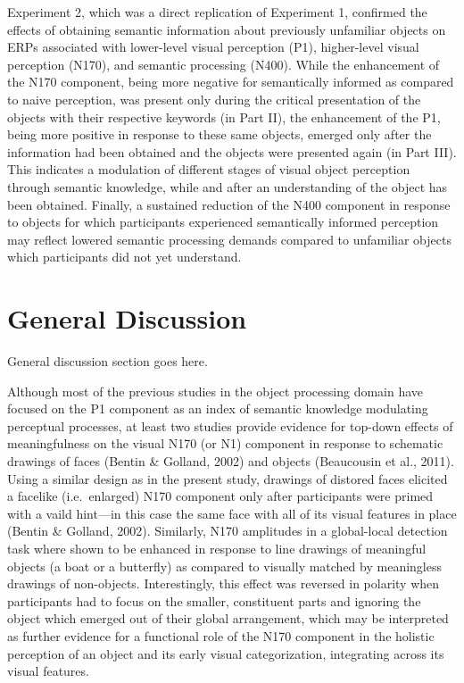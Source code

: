 \documentclass[
  english,
  man,11pt,floatsintext]{apa7}
\begin{document}
Experiment 2, which was a direct replication of Experiment 1, confirmed the effects of obtaining semantic information about previously unfamiliar objects on ERPs associated with lower-level visual perception (P1), higher-level visual perception (N170), and semantic processing (N400). While the enhancement of the N170 component, being more negative for semantically informed as compared to naive perception, was present only during the critical presentation of the objects with their respective keywords (in Part II), the enhancement of the P1, being more positive in response to these same objects, emerged only after the information had been obtained and the objects were presented again (in Part III). This indicates a modulation of different stages of visual object perception through semantic knowledge, while and after an understanding of the object has been obtained. Finally, a sustained reduction of the N400 component in response to objects for which participants experienced semantically informed perception may reflect lowered semantic processing demands compared to unfamiliar objects which participants did not yet understand.

\hypertarget{general-discussion}{%
\section{General Discussion}\label{general-discussion}}

General discussion section goes here.

Although most of the previous studies in the object processing domain have focused on the P1 component as an index of semantic knowledge modulating perceptual processes, at least two studies provide evidence for top-down effects of meaningfulness on the visual N170 (or N1) component in response to schematic drawings of faces (Bentin \& Golland, 2002) and objects (Beaucousin et al., 2011). Using a similar design as in the present study, drawings of distored faces elicited a facelike (i.e.~enlarged) N170 component only after participants were primed with a vaild hint---in this case the same face with all of its visual features in place (Bentin \& Golland, 2002). Similarly, N170 amplitudes in a global-local detection task where shown to be enhanced in response to line drawings of meaningful objects (a boat or a butterfly) as compared to visually matched by meaningless drawings of non-objects. Interestingly, this effect was reversed in polarity when participants had to focus on the smaller, constituent parts and ignoring the object which emerged out of their global arrangement, which may be interpreted as further evidence for a functional role of the N170 component in the holistic perception of an object and its early visual categorization, integrating across its visual features.
\end{document}

